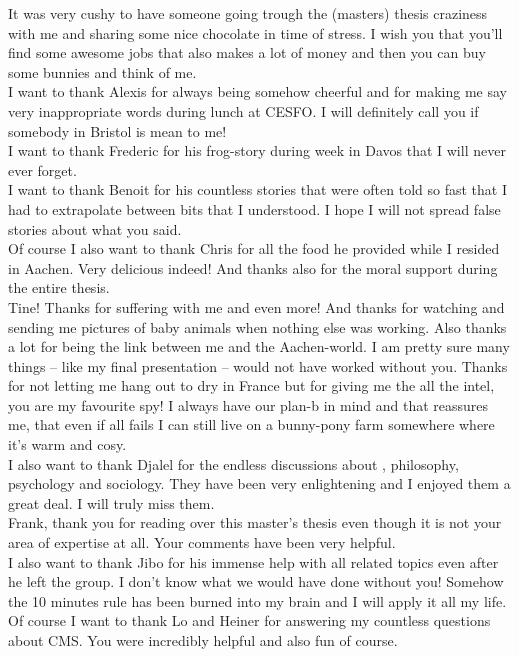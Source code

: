 It was very cushy to have someone going trough the (masters) thesis craziness with me and sharing some nice chocolate in time of stress. I wish you that you'll find some awesome jobs that also makes a lot of money and then you can buy some bunnies and think of me. \\
I want to thank Alexis for always being somehow cheerful and for making me say very inappropriate words during lunch at CESFO. I will definitely call you if somebody in Bristol is mean to me!\\
I want to thank Frederic for his frog-story during \lhcb week in Davos that I will never ever forget.\\
I want to thank Benoit for his countless stories that were often told so fast that I had to extrapolate between bits that I understood. I hope I will not spread false stories about what you said.\\
Of course I also want to thank Chris for all the food he provided while I resided in Aachen. Very delicious indeed! And thanks also for the moral support during the entire thesis.\\
Tine! Thanks for suffering with me and even more! And thanks for watching and sending me pictures of baby animals when nothing else was working. Also thanks a lot for being the link between me and the Aachen-world. I am pretty sure many things -- like my final presentation -- would not have worked without you. Thanks for not letting me hang out to dry in France but for giving me the all the intel, you are my favourite spy! I always have our plan-b in mind and that reassures me, that even if all fails I can still live on a bunny-pony farm somewhere where it's warm and cosy.\\
I also want to thank Djalel for the endless discussions about \bdts, philosophy, psychology and sociology. They have been very enlightening and I enjoyed them a great deal. I will truly miss them.\\
Frank, thank you for reading over this master's thesis even though it is not your area of expertise at all. Your comments have been very helpful.\\
I also want to thank Jibo for his immense help with all \davinci related topics even after he left the group. I don't know what we would have done  without you! Somehow the 10 minutes rule has been burned into my brain and I will apply it all my life.\\
Of course I want to thank Lo and Heiner for answering my countless questions about CMS. You were incredibly helpful and also fun of course.\\
